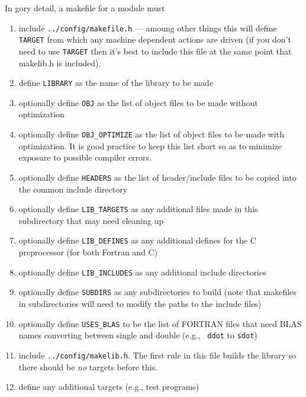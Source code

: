 In gory detail, a makefile for a module must
\begin{enumerate}
\item include \verb+../config/makefile.h+ --- amoung other things this will
    define {\tt TARGET} from which any machine dependent actions are driven
    (if you don't need to use {\tt TARGET} then it's best to include this
     file at the same point that makelib.h is included).
\item define {\tt LIBRARY} as the name of the library to be made
\item optionally define {\tt OBJ} as the list of object files to be made 
    without optimization
\item optionally define {\tt OBJ\_OPTIMIZE} as the list of object files to 
    be made with optimization.  It is good practice to keep this list 
    short so as to minimize exposure to possible compiler errors.
\item optionally define {\tt HEADERS} as the list of header/include files to be
    copied into the common include directory
\item optionally define {\tt LIB\_TARGETS} as any additional files made in
    this subdirectory that may need cleaning up
\item optionally define {\tt LIB\_DEFINES} as any additional defines for
   the C preprocessor (for both Fortran and C)
 \item optionally define {\tt LIB\_INCLUDES} as any additional include
   directories
\item optionally define {\tt SUBDIRS} as any subdirectories to build (note
  that makefiles in subdirectories will need to modify the paths to
  the include files)
\item optionally define {\tt USES\_BLAS} to be the list of FORTRAN files that
    need BLAS names converting between single and double (e.g., {\tt
      ddot} to  {\tt sdot})
\item include \verb+../config/makelib.h+.  The first rule in this file
     builds the library so there should be {\em no} targets before this.
\item define any additional targets (e.g., test programs)
\end{enumerate}

